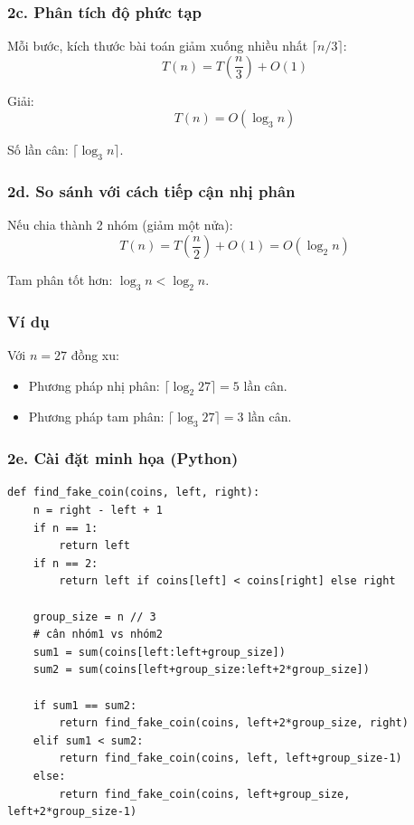 \documentclass{article}
\begin{document}
\subsubsection{2c. Phân tích độ phức tạp}

Mỗi bước, kích thước bài toán giảm xuống nhiều nhất \(\lceil n/3 \rceil\):
\[
T(n) = T\left(\frac{n}{3}\right) + O(1)
\]

Giải:
\[
T(n) = O(\log_3 n)
\]

Số lần cân: \(\lceil \log_3 n \rceil\).

\subsubsection{2d. So sánh với cách tiếp cận nhị phân}

Nếu chia thành 2 nhóm (giảm một nửa):
\[
T(n) = T\left(\frac{n}{2}\right) + O(1) = O(\log_2 n)
\]

Tam phân tốt hơn: \(\log_3 n < \log_2 n\).

\subsubsection{Ví dụ}

Với \(n = 27\) đồng xu:
\begin{itemize}
    \item Phương pháp nhị phân: \(\lceil \log_2 27 \rceil = 5\) lần cân.
    \item Phương pháp tam phân: \(\lceil \log_3 27 \rceil = 3\) lần cân.
\end{itemize}

\subsubsection{2e. Cài đặt minh họa (Python)}

\begin{verbatim}
def find_fake_coin(coins, left, right):
    n = right - left + 1
    if n == 1:
        return left
    if n == 2:
        return left if coins[left] < coins[right] else right
    
    group_size = n // 3
    # cân nhóm1 vs nhóm2
    sum1 = sum(coins[left:left+group_size])
    sum2 = sum(coins[left+group_size:left+2*group_size])
    
    if sum1 == sum2:
        return find_fake_coin(coins, left+2*group_size, right)
    elif sum1 < sum2:
        return find_fake_coin(coins, left, left+group_size-1)
    else:
        return find_fake_coin(coins, left+group_size, left+2*group_size-1)
\end{verbatim}
\end{document}
